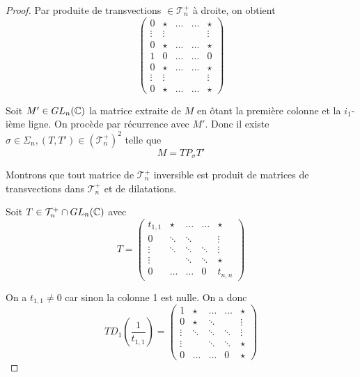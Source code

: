 \begin{proof}
    Par produite de transvections $\in\mathcal{T}_{n}^{+}$ à droite, on obtient
    \begin{equation}
        \begin{pmatrix}
            0 & \star & \dots & \dots & \star\\
            \vdots & \vdots & & &\vdots\\
            0 & \star &\dots &\dots & \star\\
            1 & 0 &\dots & \dots& 0\\
            0 & \star & \dots& \dots&\star\\
            \vdots & \vdots & & & \vdots\\
            0 & \star & \dots & \dots & \star
        \end{pmatrix}
    \end{equation}

    Soit $M'\in GL_{n}(\mathbb{C})$ la matrice extraite de $M$ en ôtant la première colonne et la $i_{1}$-ième ligne. On procède par récurrence avec $M'$. Donc il existe $\sigma\in\Sigma_{n},(T,T')\in\left(\mathcal{T}_{n}^{+}\right)^{2}$ telle que 
    \begin{equation}
        \boxed{M=TP_{\sigma}T'}
    \end{equation}

    Montrons que tout matrice de $\mathcal{T}_{n}^{+}$ inversible est produit de matrices de transvections dans $\mathcal{T}_{n}^{+}$ et de dilatations.

    Soit $T\in\mathcal{T}_{n}^{+}\cap GL_{n}(\mathbb{C})$ avec 
    \begin{equation}
        T=
        \begin{pmatrix}
            t_{1,1}&\star &\dots & \dots& \star\\
            0 & \ddots & \ddots & & \vdots\\
            \vdots & \ddots & \ddots & \ddots & \vdots\\
            \vdots & & \ddots & \ddots & \star\\
            0 &\dots & \dots & 0 & t_{n,n}
        \end{pmatrix}
    \end{equation}

    On a $t_{1,1}\neq0$ car sinon la colonne 1 est nulle. On a donc 
    \begin{equation}
        TD_{1}\left(\frac{1}{t_{1,1}}\right)=
        \begin{pmatrix}
            1&\star &\dots & \dots& \star\\
            0 & \star & \ddots & & \vdots\\
            \vdots & \ddots & \ddots & \ddots & \vdots\\
            \vdots & & \ddots & \ddots & \star\\
            0 &\dots & \dots & 0 & \star
        \end{pmatrix}
    \end{equation}


\end{proof}
